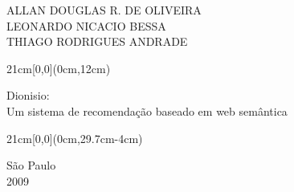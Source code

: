 \begin{center}
  {\large ALLAN DOUGLAS R. DE OLIVEIRA \\
    LEONARDO NICACIO BESSA \\
    THIAGO RODRIGUES ANDRADE}
\end{center}

\begin{textblock*}{21cm}[0,0](0cm,12cm)
  \begin{center}
    {\LARGE Dionisio:\\ Um sistema de recomendação baseado em web semântica }
  \end{center}
\end{textblock*}


\begin{textblock*}{21cm}[0,0](0cm,29.7cm-4cm)
  \begin{center}
    {\large São Paulo \\ 2009 }
  \end{center}
\end{textblock*}


